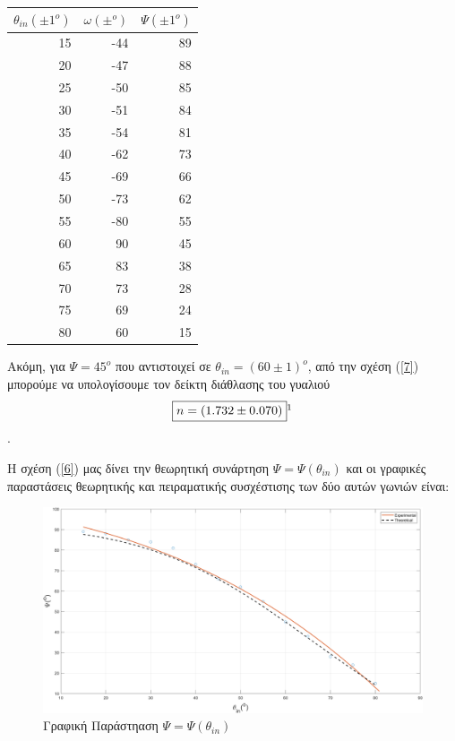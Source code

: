 \documentclass[a4paper]{article}
\begin{document}
\begin{table}[h!] 
\centering 
\caption{ }
\begin{tabular}{r|r|r}
	$\theta_{in}(\pm1^o)$ &$\omega(\pm ^o)$ & $\Psi (\pm1^o)$ \\ 
	\hline\hline
	15&-44&89\\
	20&-47&88\\ 
	25&-50&85\\
	30&-51&84\\
	35&-54&81\\
	40&-62&73\\
	45&-69&66\\
	50&-73&62\\
	55&-80&55\\
	60&90&45\\
	65&83&38\\
	70&73&28\\
	75&69&24\\
	80&60&15\\
	\end{tabular}
\end{table}



Ακόμη, για $\Psi = 45^o $ που αντιστοιχεί σε $\theta_{in}=(60\pm1)^o$, από την σχέση (\ref{7}) μπορούμε να υπολογίσουμε τον δείκτη διάθλασης του γυαλιού
$$\boxed{n = ( 1.732 \pm 0.070 )} \footnotemark $$
.

Η σχέση (\ref{6}) μας δίνει την θεωρητική συνάρτηση $\Psi = \Psi(\theta_{in})$ και οι γραφικές παραστάσεις θεωρητικής και πειραματικής συσχέστισης των δύο αυτών γωνιών είναι: 

\begin{figure}[h!]
\centering 
\caption{Γραφική Παράστηαση $\Psi=\Psi(\theta_{in})$}
\includegraphics[scale=0.5]{psitheta.png}
\end{figure}
\end{document}
